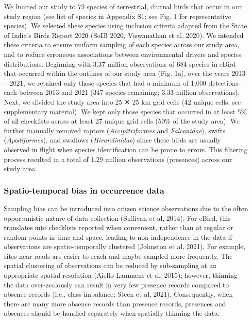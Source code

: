 We limited our study to 79 species of terrestrial, diurnal birds that occur in our study region (see list of species in Appendix S1; see Fig. 1 for representative species).
We selected these species using inclusion criteria adapted from the State of India's Birds Report 2020 (SoIB 2020, Viswanathan et al, 2020).
We intended these criteria to ensure uniform sampling of each species across our study area, and to reduce erroneous associations between environmental drivers and species distributions.
Beginning with 3.37 million observations of 684 species in eBird that occurred within the outlines of our study area (Fig. 1a), over the years 2013 -- 2021, we retained only those species that had a minimum of 1,000 detections each between 2013 and 2021 (347 species remaining; 3.33 million observations).
Next, we divided the study area into 25 ✕ 25 km grid cells (42 unique cells; see supplementary material).
We kept only those species that occurred in at least 5\% of all checklists across at least 27 unique grid cells (50\% of the study area).
We further manually removed raptors (\textit{Accipitriformes} and \textit{Falconidae}), swifts (\textit{Apodiformes}), and swallows (\textit{Hirundinidae}) since these birds are usually observed in flight when species identification can be prone to errors.
This filtering process resulted in a total of 1.29 million observations (presences) across our study area.

\subsubsection*{Spatio-temporal bias in occurrence data}

Sampling bias can be introduced into citizen science observations due to the often opportunistic nature of data collection (Sullivan et al, 2014).
For eBird, this translates into checklists reported when convenient, rather than at regular or random points in time and space, leading to non-independence in the data if observations are spatio-temporally clustered (Johnston et al, 2021).
For example, sites near roads are easier to reach and maybe sampled more frequently.
The spatial clustering of observations can be reduced by sub-sampling at an appropriate spatial resolution (Aiello-Lammens et al, 2015); however, thinning the data over-zealously can result in very few presence records compared to absence records (i.e., class imbalance; Steen et al, 2021).
Consequently, when there are many more absence records than presence records, presences and absences should be handled separately when spatially thinning the data.

